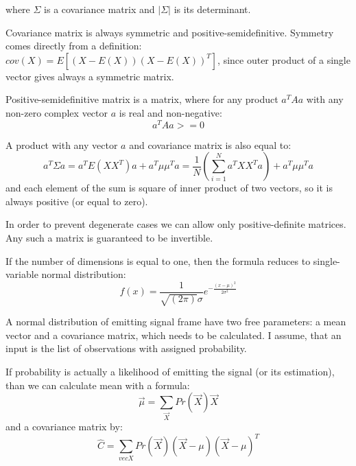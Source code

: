 \documentclass[12pt,a4paper,english]{article}
\begin{document}
where $\Sigma$ is a covariance matrix and $|\Sigma|$ is its determinant. \newline


Covariance matrix is always symmetric and positive-semidefinitive.\newline
Symmetry comes directly from a definition: $cov(X) = E[(X - E(X))(X - E(X))^T]$, since outer product of a single vector gives always a symmetric matrix. \newline

Positive-semidefinitive matrix is a matrix, where for any product $a^T A a$ with any non-zero complex vector $a$ is real and non-negative:
\begin{equation}
    a^T A a >= 0
\end{equation}

A product with any vector $a$ and covariance matrix is also equal to: 
\begin{equation}
    a^T \Sigma a = a^T E(XX^T) a + a^T\mu\mu^T a = \frac 1 N (\sum_{i=1}^N a^T X X^T a) + a^T\mu\mu^T a
\end{equation}
and each element of the sum is square of inner product of two vectors, so it is always positive (or equal to zero). \newline

In order to prevent degenerate cases we can allow only positive-definite matrices. \newline
Any such a matrix is guaranteed to be invertible. \newline


If the number of dimensions is equal to one, then the formula reduces to single-variable normal distribution: 
\begin{equation}
    f(x) = \frac 1 {\sqrt{(2\pi)}\sigma}e^{-{ \frac {(x-\mu)^2}{2 \sigma^2}}}
\end{equation}


\newpage

A normal distribution of emitting signal frame have two free parameters: a mean vector and a covariance matrix,
which needs to be calculated.\newline
I assume, that an input is the list of observations with assigned probability.\newline 

If probability is actually a likelihood of emitting the signal (or its estimation),
than we can calculate mean with a formula:   
\begin{equation}
    \vec \mu = \sum_{\vec X} Pr(\vec X) \vec X
\end{equation}
and a covariance matrix by: 
\begin{equation}
    \hat C = \sum_{vec X} Pr(\vec X) (\vec X - \mu) (\vec X - \mu)^T
\end{equation}
\newline
\end{document}
